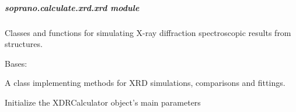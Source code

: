 \documentclass[letterpaper,10pt,english]{sphinxmanual}
\begin{document}
\subparagraph{soprano.calculate.xrd.xrd module}
\label{doctree/soprano.calculate.xrd.xrd:module-soprano.calculate.xrd.xrd}\label{doctree/soprano.calculate.xrd.xrd::doc}\label{doctree/soprano.calculate.xrd.xrd:soprano-calculate-xrd-xrd-module}
Classes and functions for simulating X-ray diffraction
spectroscopic results from structures.

\begin{fulllineitems}
\label{doctree/soprano.calculate.xrd.xrd:soprano.calculate.xrd.xrd.XRDCalculator}
Bases: 

A class implementing methods for XRD simulations, comparisons and
fittings.

Initialize the XDRCalculator object's main parameters


\end{fulllineitems}
\end{document}
